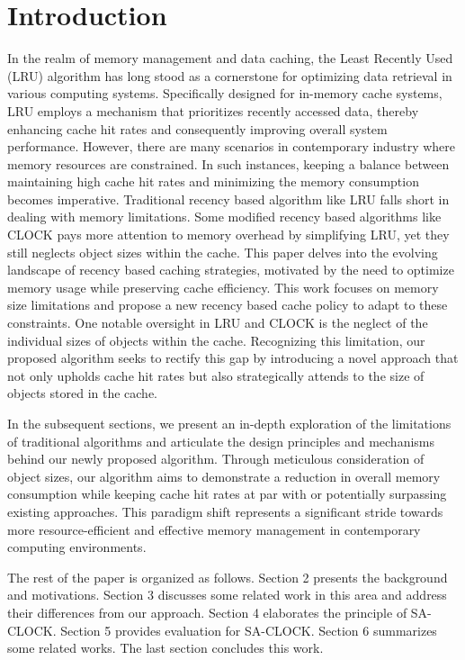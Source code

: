 \documentclass[conference]{IEEEtran}
\begin{document}
\section{Introduction}
In the realm of memory management and data caching, the Least Recently Used (LRU) algorithm has long stood as a cornerstone for optimizing data retrieval in various computing systems. Specifically designed for in-memory cache systems, LRU employs a mechanism that prioritizes recently accessed data, thereby enhancing cache hit rates and consequently improving overall system performance. However, there are many scenarios in contemporary industry where memory resources are constrained. In such instances, keeping a balance between maintaining high cache hit rates and minimizing the memory consumption becomes imperative. Traditional recency based algorithm like LRU falls short in dealing with memory limitations. Some modified recency based algorithms like CLOCK pays more attention to memory overhead by simplifying LRU, yet they still neglects object sizes within the cache.
This paper delves into the evolving landscape of recency based caching strategies, motivated by the need to optimize memory usage while preserving cache efficiency. This work focuses on memory size limitations and propose a new recency based cache policy to adapt to these constraints. One notable oversight in LRU and CLOCK is the neglect of the individual sizes of objects within the cache. Recognizing this limitation, our proposed algorithm seeks to rectify this gap by introducing a novel approach that not only upholds cache hit rates but also strategically attends to the size of objects stored in the cache.

In the subsequent sections, we present an in-depth exploration of the limitations of traditional algorithms and articulate the design principles and mechanisms behind our newly proposed algorithm. Through meticulous consideration of object sizes, our algorithm aims to demonstrate a reduction in overall memory consumption while keeping cache hit rates at par with or potentially surpassing existing approaches. This paradigm shift represents a significant stride towards more resource-efficient and effective memory management in contemporary computing environments.

The rest of the paper is organized as follows. Section 2 presents the background and motivations. Section 3 discusses some related work in this area and address their differences from our approach. Section 4 elaborates the principle of SA-CLOCK. Section 5 provides evaluation for SA-CLOCK. Section 6 summarizes some related works. The last section concludes this work.
\end{document}
